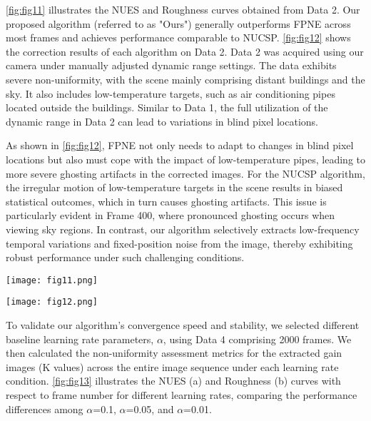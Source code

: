 \documentclass[a4paper,fleqn]{cas-dc}
\begin{document}
\cref{fig:fig11} illustrates the NUES and Roughness curves obtained from Data 2. Our proposed algorithm (referred to as "Ours") generally outperforms FPNE across most frames and achieves performance comparable to NUCSP. \cref{fig:fig12} shows the correction results of each algorithm on Data 2. Data 2 was acquired using our camera under manually adjusted dynamic range settings. The data exhibits severe non-uniformity, with the scene mainly comprising distant buildings and the sky. It also includes low-temperature targets, such as air conditioning pipes located outside the buildings. Similar to Data 1, the full utilization of the dynamic range in Data 2 can lead to variations in blind pixel locations.

As shown in \cref{fig:fig12}, FPNE not only needs to adapt to changes in blind pixel locations but also must cope with the impact of low-temperature pipes, leading to more severe ghosting artifacts in the corrected images. For the NUCSP algorithm, the irregular motion of low-temperature targets in the scene results in biased statistical outcomes, which in turn causes ghosting artifacts. This issue is particularly evident in Frame 400, where pronounced ghosting occurs when viewing sky regions. In contrast, our algorithm selectively extracts low-frequency temporal variations and fixed-position noise from the image, thereby exhibiting robust performance under such challenging conditions.

  \begin{figure*}[ht]
    \centering
    \texttt{[image: fig11.png]}
    \caption{NUES and Roughness Curves for Different Processing Algorithm Results on Data 2.(a) NUES Curve (b) Roughness Curve}
    \label{fig:fig11}
\end{figure*}

 
  \begin{figure*}[ht]
    \centering
    \texttt{[image: fig12.png]}
    \caption{Processed Images of Data 2 at Frames 1, 100, 200, 300, 400, and 500. (a)Raw images with true FPN;(b)FPNE\citep{liu_fpn_2019};(c)NUCSP\citep{dandan_nonuniformity_2024};(d)Ours}
    \label{fig:fig12}
\end{figure*}


To validate our algorithm's convergence speed and stability, we selected different baseline learning rate parameters, $\alpha$, using Data 4 comprising 2000 frames. We then calculated the non-uniformity assessment metrics for the extracted gain images (K values) across the entire image sequence under each learning rate condition. \cref{fig:fig13} illustrates the NUES (a) and Roughness (b) curves with respect to frame number for different learning rates, comparing the performance differences among $\alpha$=0.1, $\alpha$=0.05, and $\alpha$=0.01.
\end{document}
